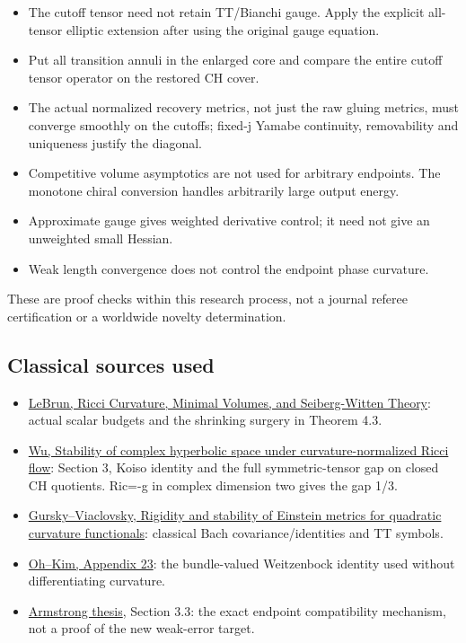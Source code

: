 \documentclass[
  10pt,
]{article}
\providecommand{\tightlist}{%
  \setlength{\itemsep}{0pt}\setlength{\parskip}{0pt}}
\begin{document}
\begin{itemize}
\tightlist
\item
  The cutoff tensor need not retain TT/Bianchi gauge. Apply the explicit
  all-tensor elliptic extension after using the original gauge equation.
\item
  Put all transition annuli in the enlarged core and compare the entire
  cutoff tensor operator on the restored CH cover.
\item
  The actual normalized recovery metrics, not just the raw gluing
  metrics, must converge smoothly on the cutoffs; fixed-j Yamabe
  continuity, removability and uniqueness justify the diagonal.
\item
  Competitive volume asymptotics are not used for arbitrary endpoints.
  The monotone chiral conversion handles arbitrarily large output
  energy.
\item
  Approximate gauge gives weighted derivative control; it need not give
  an unweighted small Hessian.
\item
  Weak length convergence does not control the endpoint phase curvature.
\end{itemize}

These are proof checks within this research process, not a journal
referee certification or a worldwide novelty determination.

\hypertarget{classical-sources-used}{%
\subsection{Classical sources used}\label{classical-sources-used}}

\begin{itemize}
\tightlist
\item
  \href{https://arxiv.org/html/math/0003068}{LeBrun, Ricci Curvature,
  Minimal Volumes, and Seiberg-Witten Theory}: actual scalar budgets and
  the shrinking surgery in Theorem 4.3.
\item
  \href{https://arxiv.org/abs/1106.0511}{Wu, Stability of complex
  hyperbolic space under curvature-normalized Ricci flow}: Section 3,
  Koiso identity and the full symmetric-tensor gap on closed CH
  quotients. Ric=-g in complex dimension two gives the gap 1/3.
\item
  \href{https://arxiv.org/abs/1105.4648}{Gursky--Viaclovsky, Rigidity
  and stability of Einstein metrics for quadratic curvature
  functionals}: classical Bach covariance/identities and TT symbols.
\item
  \href{https://www.matrix-inst.org.au/wp_Matrix2016/wp-content/uploads/2023/07/OhKim.pdf}{Oh--Kim,
  Appendix 23}: the bundle-valued Weitzenbock identity used without
  differentiating curvature.
\item
  \href{https://johnarmstrongmaths.com/publications/resources/thesis.pdf}{Armstrong
  thesis}, Section 3.3: the exact endpoint compatibility mechanism, not
  a proof of the new weak-error target.
\end{itemize}
\end{document}
